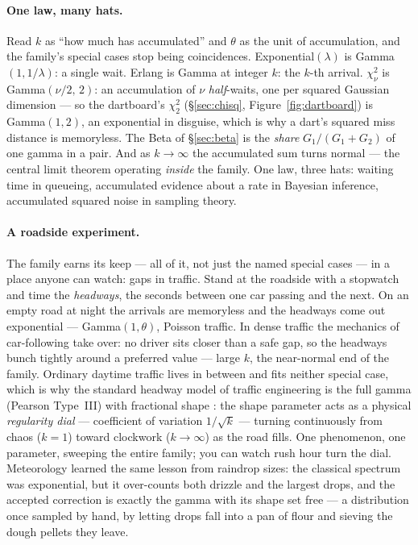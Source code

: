 \documentclass[11pt]{article}
\numberwithin{equation}{section}
\begin{document}
\paragraph{One law, many hats.}
Read $k$ as ``how much has accumulated'' and $\theta$ as the unit of
accumulation, and the family's special cases stop being coincidences.
Exponential$(\lambda)$ is Gamma$(1,1/\lambda)$: a single wait.  Erlang
is Gamma at integer $k$: the $k$-th arrival.  $\chi^2_\nu$ is
Gamma$(\nu/2,\,2)$: an accumulation of $\nu$ \emph{half}-waits, one per
squared Gaussian dimension --- so the dartboard's $\chi^2_2$
(\S\ref{sec:chisq}, Figure~\ref{fig:dartboard}) is Gamma$(1,2)$, an
exponential in disguise, which is why a dart's squared miss distance is
memoryless.  The Beta of \S\ref{sec:beta} is the \emph{share}
$G_1/(G_1{+}G_2)$ of one gamma in a pair.  And as $k\to\infty$ the
accumulated sum turns normal --- the central limit theorem operating
\emph{inside} the family.  One law, three hats: waiting time in
queueing, accumulated evidence about a rate in Bayesian inference,
accumulated squared noise in sampling theory.

\paragraph{A roadside experiment.}
The family earns its keep --- all of it, not just the named special
cases --- in a place anyone can watch: gaps in traffic.  Stand at the
roadside with a stopwatch and time the \emph{headways}, the seconds
between one car passing and the next.  On an empty road at night the
arrivals are memoryless and the headways come out exponential ---
Gamma$(1,\theta)$, Poisson traffic.  In dense traffic the mechanics of
car-following take over: no driver sits closer than a safe gap, so the
headways bunch tightly around a preferred value --- large $k$, the
near-normal end of the family.  Ordinary daytime traffic lives in
between and fits neither special case, which is why the standard
headway model of traffic engineering is the full gamma (Pearson
Type~III) with fractional shape \citep{may1990}: the shape parameter
acts as a physical \emph{regularity dial} --- coefficient of variation
$1/\sqrt{k}$ --- turning continuously from chaos ($k=1$) toward
clockwork ($k\to\infty$) as the road fills.  One phenomenon, one
parameter, sweeping the entire family; you can watch rush hour turn
the dial.  Meteorology learned the same lesson from raindrop sizes:
the classical \citet{marshall1948} spectrum was exponential, but it
over-counts both drizzle and the largest drops, and the accepted
correction \citep{ulbrich1983} is exactly the gamma with its shape set
free --- a distribution once sampled by hand, by letting drops fall
into a pan of flour and sieving the dough pellets they leave.
\end{document}
